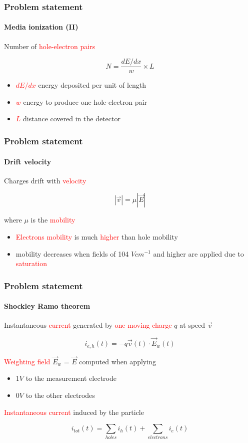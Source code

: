 \documentclass[14pt]{beamer}
\begin{document}
\begin{frame}
  \frametitle{Problem statement}
  \framesubtitle{Media ionization (II)}

  Number of \textcolor{red}{hole-electron pairs}

  \[N = \frac{dE/dx}{w} \times L\]

\begin{itemize}
  \item \textcolor{red}{$dE/dx$} energy deposited per unit of length
  \item \textcolor{red}{$w$} energy to produce one hole-electron pair
  \item \textcolor{red}{$L$} distance covered in the detector
\end{itemize}

\end{frame}

\begin{frame}
  \frametitle{Problem statement}
  \framesubtitle{Drift velocity}

  Charges drift with \textcolor{red}{velocity}

  \[|\vec{v}| = \mu |\vec{E}|\]

  where  $\mu$ is the \textcolor{red}{mobility}

  \begin{itemize}
    \item \textcolor{red}{Electrons mobility} is much \textcolor{red}{higher} than hole mobility
    \item mobility decreases when fields of 104 $V cm^{-1}$ and higher are
    applied due to \textcolor{red}{saturation}

  \end{itemize}
\end{frame}

\begin{frame}
  \frametitle{Problem statement}
  \framesubtitle{Shockley Ramo theorem}

   Instantaneous \textcolor{red}{current} generated	by \textcolor{red}{one moving charge} $q$ at speed $\vec{v}$

		\[i_{e,h}(t) = -q \vec{v}(t) \cdot \vec{E}_w(t)\]

	\textcolor{red}{Weighting field} $\vec{E}_w$ = $\vec{E}$ computed when applying

\begin{itemize}
  \item $1V$ to the measurement electrode
	\item $0V$ to the other electrodes
\end{itemize}

\textcolor{red}{Instantaneous current} induced by the particle

\[i_{tot}(t) = \sum_{holes} i_h(t) + \sum_{electrons} i_e(t)\]
\end{frame}
\end{document}
